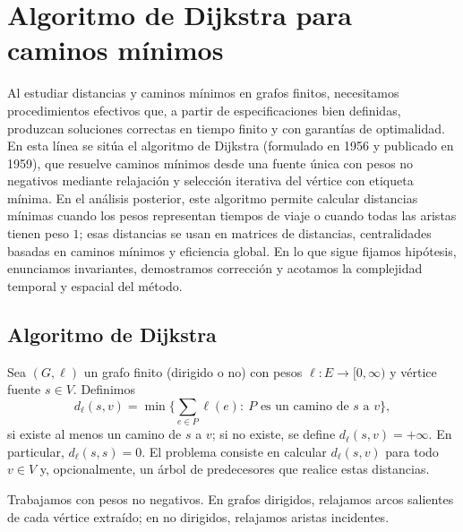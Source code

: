     \section{Algoritmo de Dijkstra para caminos mínimos}
        Al estudiar distancias y caminos mínimos en grafos finitos, necesitamos procedimientos efectivos que, a partir de especificaciones bien definidas, produzcan soluciones correctas en tiempo finito y con garantías de optimalidad. En esta línea se sitúa el algoritmo de Dijkstra (formulado en 1956 y publicado en 1959), que resuelve caminos mínimos desde una fuente única con pesos no negativos mediante relajación y selección iterativa del vértice con etiqueta mínima. En el análisis posterior, este algoritmo permite calcular distancias mínimas cuando los pesos representan tiempos de viaje o cuando todas las aristas tienen peso $1$; esas distancias se usan en matrices de distancias, centralidades basadas en caminos mínimos y eficiencia global. En lo que sigue fijamos hipótesis, enunciamos invariantes, demostramos corrección y acotamos la complejidad temporal y espacial del método.

        \subsection{Algoritmo de Dijkstra}

            \begin{definicion}
                Sea $(G,\ell)$ un grafo finito (dirigido o no) con pesos $\ell:E\to[0,\infty)$ y vértice fuente $s\in V$. Definimos
                \[
                d_\ell(s,v)=
                \min\Big\{\sum_{e\in P}\ell(e):\ P \text{ es un camino de } s \text{ a } v\Big\},
                \]
                si existe al menos un camino de $s$ a $v$; si no existe, se define $d_\ell(s,v)=+\infty$. En particular, $d_\ell(s,s)=0$. El problema consiste en calcular $d_\ell(s,v)$ para todo $v\in V$ y, opcionalmente, un árbol de predecesores que realice estas distancias.
            \end{definicion}

            \begin{observacion}[Hipótesis]
                Trabajamos con pesos no negativos. En grafos dirigidos, relajamos arcos salientes de cada vértice extraído; en no dirigidos, relajamos aristas incidentes.
            \end{observacion}

